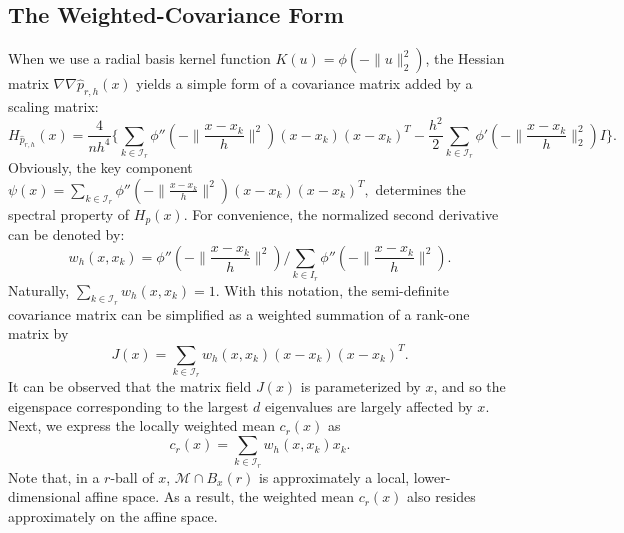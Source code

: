 \documentclass[aos,preprint]{imsart}
\theoremstyle{remark}
\begin{document}
\subsection{The Weighted-Covariance Form}
When we use a radial basis kernel function $K(u) = \phi(-\|u\|_2^2)$, the Hessian matrix $\nabla\nabla \hat{p}_{r,h}(x)$ yields a simple form of a covariance matrix added by a scaling matrix:
\begin{equation}\label{HP}
H_{\hat{p}_{r,h}}(x) =\frac{4}{nh^4}\{ \sum_{k\in {\mathcal I}_r } \phi''(-\|\frac{x-x_k}{h}\|^2)(x-x_k) (x-x_k)^T -\frac{h^2}{2}\sum_{k\in {\mathcal I}_r} \phi'(-\|\frac{x-x_k}{h}\|_2^2)I\}.
\end{equation}
Obviously, the key component 
$
\psi(x) = \sum_{k\in {\mathcal I}_r } \phi''(-\|\frac{x-x_k}{h}\|^2)(x-x_k) (x-x_k)^T,
$ determines the spectral property of $H_p(x)$. For convenience, the normalized second derivative can be denoted by: 
\[
w_h(x, x_k) = \phi''(-\|\frac{x-x_k}{h}\|^2)/\sum_{k\in I_r}\phi''(-\|\frac{x-x_k}{h}\|^2) .
\]
Naturally, $\sum_{k \in {\mathcal I}_r} w_h(x, x_k) = 1$. With this notation, the semi-definite covariance matrix can be simplified as a weighted summation of a rank-one matrix by
\begin{equation}\label{Jx}
J(x) = \sum_{k\in {\mathcal I}_r } w_h(x, x_k)(x-x_k) (x-x_k)^T.
\end{equation}
It can be observed that the matrix field $J(x)$ is parameterized by $x$, and so the eigenspace corresponding to the largest $d$ eigenvalues are largely affected by $x$. Next, we express the locally weighted mean $c_r(x)$ as
 \[
 c_r(x) =  \sum_{k\in {\mathcal I}_r }w_h(x, x_k) x_k.
 \]
%
Note that, in a $r$-ball of $x$, ${\mathcal M} \cap B_x(r)$ is approximately a local, lower-dimensional affine space. As a result, the weighted mean $c_r(x)$ also resides approximately on the affine space.
\end{document}
